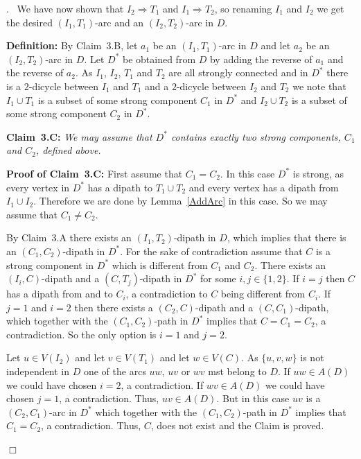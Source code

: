 \documentclass{article}
\newcommand{\2}{\vspace{2mm}}
\renewenvironment{proof}[1][]{\par \noindent {\bf Proof#1}.\ }{\hfill$\Box$
\par \vspace{11pt}}
\theoremstyle{definition}
\begin{document}
\begin{proof}
We have now shown that $I_2 \Rightarrow T_1$ and $I_1 \Rightarrow T_2$, so renaming $I_1$ and $I_2$ we get the desired
$(I_1,T_1)$-arc and an $(I_2,T_2)$-arc in $D$.

\2

{\bf Definition:} By Claim~3.B, let $a_1$ be an $(I_1,T_1)$-arc in $D$ and let $a_2$ be an $(I_2,T_2)$-arc in $D$.
Let $D^*$ be obtained from $D$ by adding the reverse of $a_1$ and the reverse of $a_2$.
As $I_1$, $I_2$, $T_1$ and $T_2$ are all strongly connected and in $D^*$ there is a $2$-dicycle between $I_1$ and $T_1$
and a $2$-dicycle between $I_2$ and $T_2$ we note that $I_1 \cup T_1$ is a subset of some strong component $C_1$ in $D^*$ 
and $I_2 \cup T_2$ is a subset of some strong component $C_2$ in $D^*$.

\2

{\bf Claim~3.C:} {\em We may assume that $D^*$ contains exactly two strong components, $C_1$ and $C_2$, defined above.}

\2

{\bf Proof of Claim~3.C:} First assume that $C_1 = C_2$. In this case $D^*$ is strong, as every vertex in $D^*$
has a dipath to $T_1 \cup T_2$ and every vertex has a dipath from $I_1 \cup I_2$. Therefore we are done by 
Lemma~\ref{AddArc} in this case.
So we may assume that $C_1 \not= C_2$.

By Claim~3.A there exists an $(I_1,T_2)$-dipath in $D$, which implies that there is an $(C_1,C_2)$-dipath in $D^*$.
For the sake of contradiction assume that $C$ is a strong component in $D^*$ which is different from $C_1$ and $C_2$.
There exists an $(I_i,C)$-dipath and a $(C,T_j)$-dipath in $D^*$ for some $i,j \in \{1,2\}$.
If $i=j$ then $C$ has a dipath from and to $C_i$, a contradiction to $C$ being different from $C_i$. 
If $j=1$ and $i=2$ then there exists a $(C_2,C)$-dipath and a $(C,C_1)$-dipath, which together with the $(C_1,C_2)$-path in $D^*$
implies that $C=C_1=C_2$, a contradiction. So the only option is $i=1$ and $j=2$. 

Let $u \in V(I_2)$ and let $v \in V(T_1)$ and let $w \in V(C)$. As $\{u,v,w\}$ is not independent in $D$ one of the arcs
$uw$, $uv$ or $wv$ mst belong to $D$.  If $uw \in A(D)$ we could have chosen $i=2$, a contradiction. If $wv \in A(D)$
we could have chosen $j=1$, a contradiction. Thus, $uv \in A(D)$. But in this case $uv$ is a $(C_2,C_1)$-arc in $D^*$
which together with the $(C_1,C_2)$-path in $D^*$ implies that $C_1=C_2$, a contradiction.
Thus, $C$, does not exist and the Claim is proved.


\end{proof}
\end{document}
